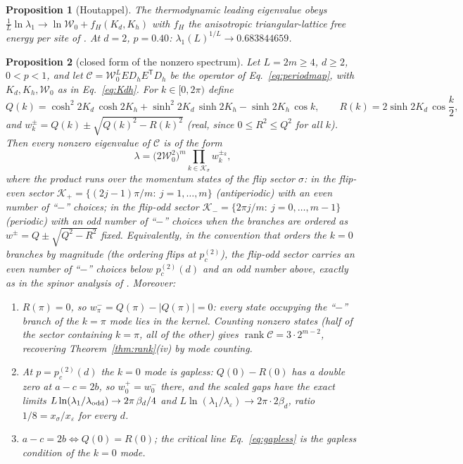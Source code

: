 \documentclass[11pt]{article}
\newtheorem{proposition}{Proposition}
\newcommand{\pctwo}{p_c^{(2)}}
\newcommand{\Ccomp}{\mathcal{C}}
\newcommand{\Wz}{\mathcal{W}_0}
\begin{document}
\begin{proposition}[Houtappel]\label{prop:houtappel}
The thermodynamic leading eigenvalue obeys
$\frac1L\ln\lambda_1\to\ln\Wz+f_H(K_d,K_h)$ with $f_H$ the anisotropic
triangular-lattice free energy per site of \citet{Houtappel1950}.  At
$d=2$, $p=0.40$: $\lambda_1(L)^{1/L}\to0.683844659$.
\end{proposition}

\begin{proposition}[closed form of the nonzero spectrum]
\label{prop:spectrum}
Let $L=2m\ge4$, $d\ge2$, $0<p<1$, and let
$\Ccomp=\Wz^L E D_h E^{\mathsf T}D_h$ be the operator of
Eq.~\eqref{eq:periodmap}, with $K_d,K_h,\Wz$ as in Eq.~\eqref{eq:Kdh}.  For
$k\in[0,2\pi)$ define
\begin{equation}
  Q(k)=\cosh^2\!2K_d\,\cosh 2K_h+\sinh^2\!2K_d\,\sinh 2K_h
        -\sinh 2K_h\,\cos k,\qquad
  R(k)=2\sinh 2K_d\,\cos\frac{k}{2},
  \label{eq:QRdef}
\end{equation}
and $w_k^\pm=Q(k)\pm\sqrt{Q(k)^2-R(k)^2}$ (real, since $0\le R^2\le Q^2$ for
all $k$).  Then every nonzero eigenvalue of $\Ccomp$ is of the form
\begin{equation}
  \lambda=\bigl(2\Wz^2\bigr)^m\prod_{k\in\mathcal K_\sigma} w_k^{\pm_k},
  \label{eq:spectrum}
\end{equation}
where the product runs over the momentum states of the flip sector $\sigma$:
in the flip-even sector
$\mathcal K_+=\{(2j-1)\pi/m:\ j=1,\dots,m\}$ (antiperiodic) with an
\emph{even} number of ``$-$'' choices; in the flip-odd sector
$\mathcal K_-=\{2\pi j/m:\ j=0,\dots,m-1\}$ (periodic) with an \emph{odd}
number of ``$-$'' choices when the branches are ordered as
$w^\pm=Q\pm\sqrt{Q^2-R^2}$ fixed.  Equivalently, in the convention that
orders the $k=0$ branches by magnitude (the ordering flips at $\pctwo$),
the flip-odd sector carries an even number of ``$-$'' choices below
$\pctwo(d)$ and an odd number above, exactly as in the spinor analysis of
\citet{Kaufman1949,Newell1950}.  Moreover:
\begin{enumerate}
\item[(i)] $R(\pi)=0$, so $w_\pi^-=Q(\pi)-|Q(\pi)|=0$: every state occupying
      the ``$-$'' branch of the $k=\pi$ mode lies in the kernel.  Counting
      nonzero states (half of the sector containing $k=\pi$, all of the
      other) gives $\operatorname{rank}\Ccomp=3\cdot2^{m-2}$, recovering
      Theorem~\ref{thm:rank}(iv) by mode counting.
\item[(ii)] At $p=\pctwo(d)$ the $k=0$ mode is gapless:
      $Q(0)-R(0)$ has a double zero at $a-c=2b$, so
      $w_0^+=w_0^-$ there, and the scaled gaps have the exact limits
      $L\ln(\lambda_1/\lambda_{\rm odd})\to2\pi\,\beta_d/4$ and
      $L\ln(\lambda_1/\lambda_\varepsilon)\to2\pi\cdot2\beta_d$, ratio
      $1/8=x_\sigma/x_\varepsilon$ for every $d$.
\item[(iii)] $a-c=2b\iff Q(0)=R(0)$; the critical line
      Eq.~\eqref{eq:gapless} is the gapless condition of the $k=0$ mode.
\end{enumerate}
\end{proposition}
\end{document}
